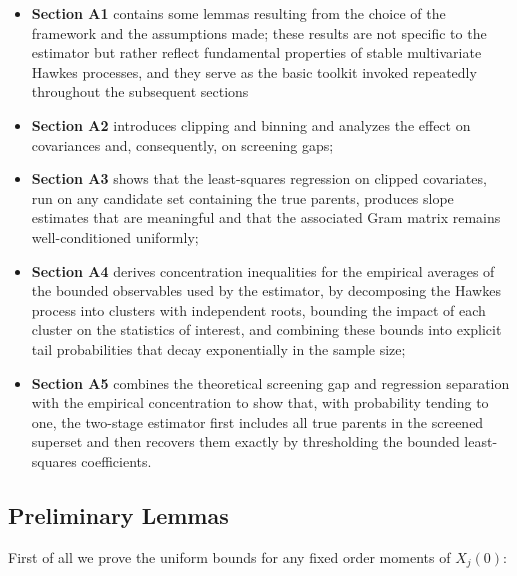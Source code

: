 \documentclass{article}
\begin{document}
\begin{itemize}
    \item \textbf{Section A1} contains some lemmas resulting from the choice of the framework and the assumptions made; these results are not specific to the estimator but rather reflect fundamental properties of stable multivariate Hawkes processes, and they serve as the basic toolkit invoked repeatedly throughout the subsequent sections
    \item \textbf{Section A2} introduces clipping and binning and analyzes the effect on covariances and, consequently, on screening gaps;
    \item \textbf{Section A3} shows that the least-squares regression on clipped covariates, run on any candidate set containing the true parents, produces slope estimates that are meaningful and that the associated Gram matrix remains well-conditioned uniformly;
    \item \textbf{Section A4} derives concentration inequalities for the empirical averages of the bounded observables used by the estimator, by decomposing the Hawkes process into clusters with independent roots, bounding the impact of each cluster on the statistics of interest, and combining these bounds into explicit tail probabilities that decay exponentially in the sample size;
    \item \textbf{Section A5} combines the theoretical screening gap and regression separation with the empirical concentration to show that, with probability tending to one, the two-stage estimator first includes all true parents in the screened superset and then recovers them exactly by thresholding the bounded least-squares coefficients.
\end{itemize}



\subsection{Preliminary Lemmas}
\label{appendix:1}

First of all we prove the uniform bounds for any fixed order moments of $X_j(0)$: 
\end{document}
